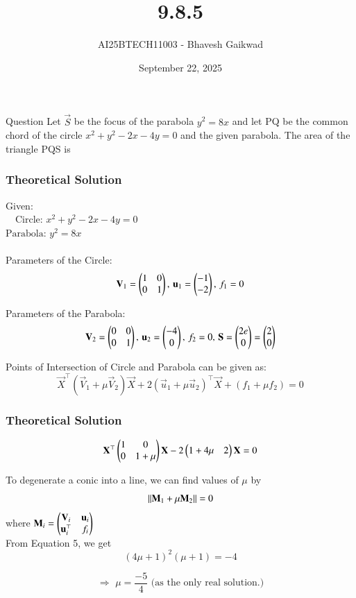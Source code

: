 \documentclass{beamer}
\title
{9.8.5}
\date{September 22, 2025}
\author 
{AI25BTECH11003 - Bhavesh Gaikwad}
\begin{document}
\frame{\titlepage}
\begin{frame}{Question}
Let $\vec{S}$ be the focus of the parabola $y^2 = 8x$ and let PQ be the common chord of the circle $x^2 + y^2 - 2x - 4y = 0$ and the given parabola. The area of the triangle PQS is
\end{frame}


\begin{frame}[fragile]
    \frametitle{Theoretical Solution}
      Given:\\
$\quad \text{Circle: }x^2 + y^2 - 2x - 4y = 0$\\
$\text{Parabola: }y^2 = 8x$\\\\


Parameters of the Circle:
\begin{equation}
\mathbf{V}_1 = \begin{pmatrix}1 & 0 \\ 0 & 1\end{pmatrix}, \, \mathbf{u}_1 = \begin{pmatrix}-1 \\ -2\end{pmatrix}, \, f_1 = 0   
\end{equation}

Parameters of the Parabola:
\begin{equation}
\mathbf{V}_2 = \begin{pmatrix}0 & 0 \\ 0 & 1\end{pmatrix}, \, \mathbf{u}_2 = \begin{pmatrix}-4 \\ 0\end{pmatrix}, \, f_2 = 0, \, \mathbf{S} = \begin{pmatrix}2e \\ 0 \end{pmatrix} = \begin{pmatrix}2 \\ 0\end{pmatrix}   
\end{equation}

Points of Intersection of Circle and Parabola can be given as:
\begin{equation}
\vec{X}^\top(\vec{V}_1+\mu\vec{V}_2)\vec{X} + 2(\vec{u}_1+\mu\vec{u}_2)^\top\vec{X} + (f_1 + \mu f_2) = 0
\end{equation}
\end{frame}


\begin{frame}[fragile]
    \frametitle{Theoretical Solution}
\begin{equation}
\mathbf{X}^\top\begin{pmatrix}1 & 0 \\ 0 & 1+\mu\end{pmatrix}\mathbf{X} - 2\begin{pmatrix}1+4\mu & 2\end{pmatrix}\mathbf{X} = 0    
\end{equation}

To degenerate a conic into a line, we can find values of $\mu$ by
\begin{equation}
\left\lVert\mathbf{M}_1 + \mu\mathbf{M}_2\right\rVert =0
\end{equation}
where $\mathbf{M}_i = \begin{pmatrix}\mathbf{V}_i & \mathbf{u}_i \\ \mathbf{u}_i^\top & f_i\end{pmatrix}$\\

From Equation 5, we get 
\begin{equation}
    (4\mu+1)^2(\mu + 1) = -4
\end{equation}

\begin{equation}
\Rightarrow \, \, \mu = \dfrac{-5}{4} \text{ (as the only real solution.)}    
\end{equation}
\end{frame}
\end{document}
